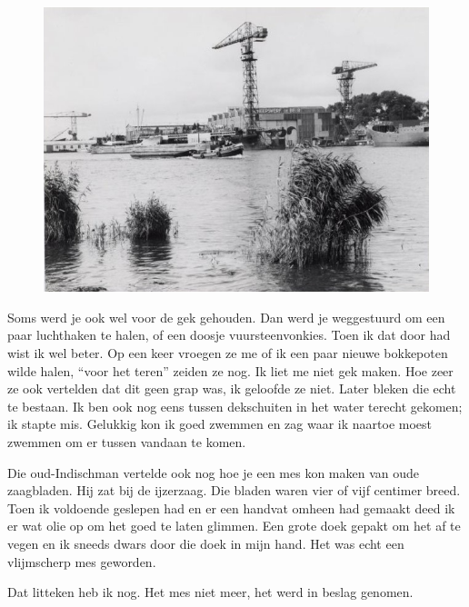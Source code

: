 \documentclass[12pt,twoside]{memoir}
\begin{document}
\begin{figure}
\includegraphics[width=\textwidth]{img/ch15/1964}
\end{figure}

Soms werd je ook wel voor de gek gehouden. Dan werd je weggestuurd om een paar luchthaken te halen, of een doosje vuursteenvonkies. Toen ik dat door had wist ik wel beter. Op een keer vroegen ze me of ik een paar nieuwe bokkepoten wilde halen, ``voor het teren'' zeiden ze nog. Ik liet me niet gek maken. Hoe zeer ze ook vertelden dat dit geen grap was, ik geloofde ze niet. Later bleken die echt te bestaan. Ik ben ook nog eens tussen dekschuiten in het water terecht gekomen; ik stapte mis. Gelukkig kon ik goed zwemmen en zag waar ik naartoe moest zwemmen om er tussen vandaan te komen. 

Die oud-Indischman vertelde ook nog hoe je een mes kon maken van oude zaagbladen. Hij zat bij de ijzerzaag. Die bladen waren vier of vijf centimer breed. Toen ik voldoende geslepen had en er een handvat omheen had gemaakt deed ik er wat olie op om het goed te laten glimmen. Een grote doek gepakt om het af te vegen en ik sneeds dwars door die doek in mijn hand. Het was echt een vlijmscherp mes geworden. 

Dat litteken heb ik nog. Het mes niet meer, het werd in beslag genomen.
\end{document}
